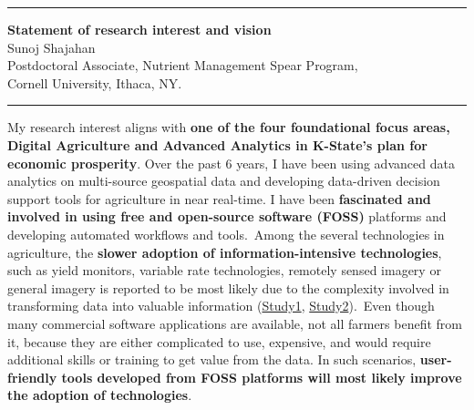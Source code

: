 \documentclass[11pt]{article}
\begin{document}
\begin{center}
\hrule
{\Large\textbf{Statement of research interest and vision}}\\
\vspace{0.5em}
\normalsize{Sunoj Shajahan\\
Postdoctoral Associate, Nutrient Management Spear Program,\\
Cornell University, Ithaca, NY.}
\vspace{0.5em}
\hrule
\end{center}
\vspace{0.5em}
\justify
{}
\hspace{1.5em} My research interest aligns with \textbf{one of the four foundational focus areas, Digital Agriculture and Advanced Analytics in K-State's plan for economic prosperity}. Over the past 6 years, I have been using advanced data analytics on multi-source geospatial data and developing data-driven decision support tools for agriculture in near real-time. I have been \textbf{fascinated and involved in using free and open-source software (FOSS)} platforms and developing automated workflows and tools.~Among the several technologies in agriculture, the \textbf{slower adoption of information-intensive technologies}, such as yield monitors, variable rate technologies, remotely sensed imagery or general imagery is reported to be most likely due to the complexity involved in transforming data into valuable information (\href{https://agecon.unl.edu/cornhusker-economics/2017/precision-agriculture-adoption-profitability}{Study1}, \href{https://www.emerald.com/insight/content/doi/10.1108/AFR-11-2019-0121/full/html}{Study2}).~Even though many commercial software applications are available, not all farmers benefit from it, because they are either complicated to use, expensive, and would require additional skills or training to get value from the data. In such scenarios, \textbf{user-friendly tools developed from FOSS platforms will most likely improve the adoption of technologies}. 



\end{document}
